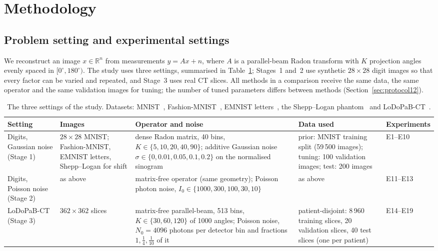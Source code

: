 \section{Methodology}
\label{sec:method}

\subsection{Problem setting and experimental settings}\label{sec:settings}
We reconstruct an image $x\in\mathbb{R}^n$ from measurements $y=Ax+n$, where $A$ is a parallel-beam Radon transform with $K$ projection angles evenly spaced in $[0^\circ,180^\circ)$.
The study uses three settings, summarised in Table~\ref{tab:settings}; Stages~1 and~2 use synthetic $28\times28$ digit images so that every factor can be varied and repeated, and Stage~3 uses real CT slices.
All methods in a comparison receive the same data, the same operator and the same validation images for tuning; the number of tuned parameters differs between methods (Section~\ref{sec:protocol12}).

\begin{table}[htbp]
\centering\small\setlength{\tabcolsep}{4pt}
\caption{The three settings of the study. Datasets: MNIST~\citep{lecun1998mnist},
Fashion-MNIST~\citep{xiao2017fashion}, EMNIST letters~\citep{cohen2017emnist},
the Shepp--Logan phantom~\citep{shepp1974} and LoDoPaB-CT~\citep{leuschner2021}.}\label{tab:settings}
\begin{tabular}{p{2.3cm}p{2.6cm}p{3.6cm}p{3.2cm}p{3.0cm}}
\toprule
Setting & Images & Operator and noise & Data used & Experiments\\
\midrule
Digits, Gaussian noise (Stage 1) & $28\times28$ MNIST; Fashion-MNIST, EMNIST letters, Shepp--Logan for shift & dense Radon matrix, 40 bins, $K\in\{5,10,20,40,90\}$; additive Gaussian noise $\sigma\in\{0,0.01,0.05,0.1,0.2\}$ on the normalised sinogram & prior: MNIST training split (59\,500 images); tuning: 100 validation images; test: 200 images & E1--E10\\
Digits, Poisson noise (Stage 2) & as above & matrix-free operator (same geometry); Poisson photon noise, $I_0\in\{1000,300,100,30,10\}$ & as above & E11--E13\\
LoDoPaB-CT (Stage 3) & $362\times362$ slices & matrix-free parallel-beam, 513 bins, $K\in\{30,60,120\}$ of 1000 angles; Poisson noise, $N_0=4096$ photons per detector bin and fractions $1,\tfrac14,\tfrac1{10}$ of it & patient-disjoint: 8\,960 training slices, 20 validation slices, 40 test slices (one per patient) & E14--E19\\
\bottomrule
\end{tabular}
\end{table}


